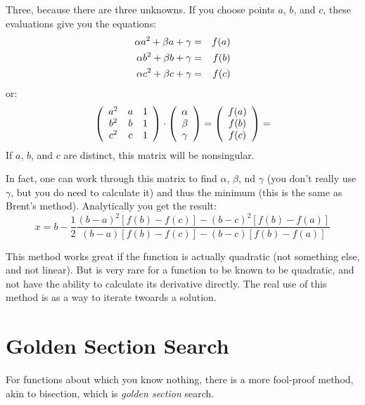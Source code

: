 
\begin{answer}
Three, because there are three unknowns. If you choose points $a$,
$b$, and $c$, these evaluations give you the equations:
\begin{eqnarray}
\alpha a^2 + \beta a + \gamma &=& f(a) \cr
\alpha b^2 + \beta b + \gamma &=& f(b) \cr
\alpha c^2 + \beta c + \gamma &=& f(c) \cr
\end{eqnarray}
or:
\begin{equation}
  \left(\begin{array}{ccc}
    a^2 & a & 1 \cr
    b^2 & b & 1 \cr
    c^2 & c & 1 
  \end{array}\right) \cdot
  \left(\begin{array}{c}
    \alpha \cr
    \beta \cr
    \gamma
    \end{array}\right) = 
  \left(\begin{array}{c}
    f(a) \cr
    f(b) \cr
    f(c)
    \end{array}\right) = 
\end{equation}
If $a$, $b$, and $c$ are distinct, this matrix will be nonsingular.
\end{answer}

In fact, one can work through this matrix to find $\alpha$, $\beta$,
nd $\gamma$ (you don't really use $\gamma$, but you do need to
calculate it) and thus the minimum (this is the same as Brent's
method). Analytically you get the result:
\begin{equation}
  x = b - \frac{1}{2}
  \frac{(b-a)^2 \left[f(b) - f(c)\right] - (b-c)^2
  \left[f(b) - f(a)\right]}
  {(b-a) \left[f(b) - f(c)\right] - (b-c) \left[f(b) - f(a)\right]}
\end{equation}

This method works great if the function is actually quadratic (not
something else, and not linear). But is very rare for a function to be
known to be quadratic, and not have the ability to calculate its
derivative directly. The real use of this method is as a way to
iterate twoards a solution.

\section{Golden Section Search}

For functions about which you know nothing, there is a more fool-proof
method, akin to bisection, which is {\it golden section} search.

